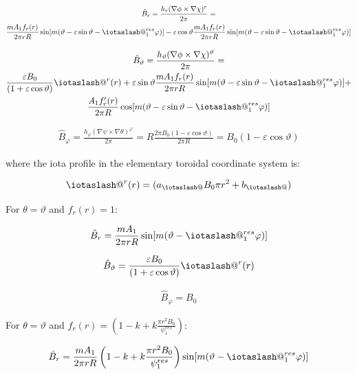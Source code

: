 \documentclass[11pt,a4paper,oneside]{article}
\makeatletter
\newcommand{\iotaslash}{{\mathpalette\iotaslash@\relax}}
\newcommand{\iotaslash@}[2]{
  \raisebox{-0.6\height}[0pt][0pt]{%
    \rotatebox[origin=Bl]{15}{$\m@th#1{\mkern-1mu\mathchar'26}$}%
  }%
  \mkern-9.5mu\nonscript\mkern-1mu
  \iota
  \mkern1mu
}
\makeatother
\begin{document}
\begin{multline}
\hat{B}_{r}=\frac{h_r(\nabla \phi \times \nabla \chi)^r}{2\pi}=\\
\frac{mA_1f_r(r)}{2\pi rR}\sin[m(\vartheta-\varepsilon \sin{\vartheta}-\iotaslash^{res}_1\varphi)]-\varepsilon\cos{\vartheta}\frac{mA_1f_r(r)}{2\pi rR}\sin[m(\vartheta-\varepsilon \sin{\vartheta}-\iotaslash^{res}_1\varphi)]
\end{multline}

\begin{multline}
\hat{B}_{\vartheta}=\frac{h_\vartheta(\nabla \phi \times \nabla \chi)^\vartheta}{2\pi}=\\
\frac{\varepsilon B_0}{(1+\varepsilon \cos{\vartheta})}\iotaslash^r(r)+\varepsilon \sin{\vartheta}\frac{mA_1f_r(r)}{2\pi rR}\sin[m(\vartheta-\varepsilon \sin{\vartheta}-\iotaslash^{res}_1\varphi)]+\\
\frac{A_1f_r'(r)}{2\pi R}\cos[m(\vartheta-\varepsilon \sin{\vartheta}-\iotaslash^{res}_1\varphi)]
\end{multline}

\begin{align}
\hat{B}_{\varphi}=\frac{h_\varphi(\nabla \psi \times \nabla \theta)^\varphi}{2\pi}=R\frac{2\pi B_0 (1-\varepsilon \cos{\vartheta})}{2\pi R}=B_0 (1-\varepsilon \cos{\vartheta})
\end{align}

where the iota profile in the elementary toroidal coordinate system is:

\begin{align}
\iotaslash^r(r)=(a_\iotaslash B_0 \pi r^2+b_\iotaslash)
\end{align}

For $\theta = \vartheta$ and $f_r(r)=1$:

\begin{align}
\hat{B}_{r}=\frac{mA_1}{2\pi rR}\sin[m(\vartheta-\iotaslash^{res}_1\varphi)]
\end{align}

\begin{align}
\hat{B}_{\vartheta}=
\frac{\varepsilon B_0}{(1+\varepsilon \cos{\vartheta})}\iotaslash^r(r)
\end{align}

\begin{align}
\hat{B}_{\varphi}=B_0 
\end{align}

For $\theta = \vartheta$ and $f_r(r)=\left(1-k+k\frac{\pi r^2 B_0}{\psi^{res}_1}\right)$:

\begin{align}
\hat{B}_{r}=\frac{mA_1}{2\pi rR}\left(1-k+k\frac{\pi r^2 B_0}{\psi^{res}_1}\right)\sin[m(\vartheta-\iotaslash^{res}_1\varphi)]
\end{align}
\end{document}
